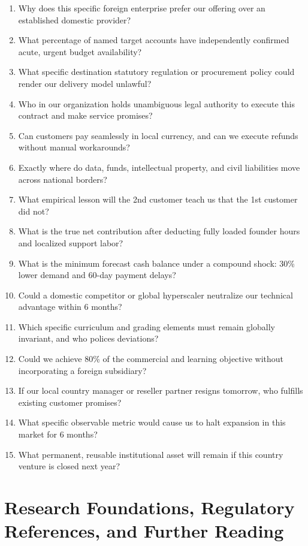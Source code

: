 \begin{enumerate}
    \item Why does this specific foreign enterprise prefer our offering over an established domestic provider?
    \item What percentage of named target accounts have independently confirmed acute, urgent budget availability?
    \item What specific destination statutory regulation or procurement policy could render our delivery model unlawful?
    \item Who in our organization holds unambiguous legal authority to execute this contract and make service promises?
    \item Can customers pay seamlessly in local currency, and can we execute refunds without manual workarounds?
    \item Exactly where do data, funds, intellectual property, and civil liabilities move across national borders?
    \item What empirical lesson will the 2nd customer teach us that the 1st customer did not?
    \item What is the true net contribution after deducting fully loaded founder hours and localized support labor?
    \item What is the minimum forecast cash balance under a compound shock: 30\% lower demand and 60-day payment delays?
    \item Could a domestic competitor or global hyperscaler neutralize our technical advantage within 6 months?
    \item Which specific curriculum and grading elements must remain globally invariant, and who polices deviations?
    \item Could we achieve 80\% of the commercial and learning objective without incorporating a foreign subsidiary?
    \item If our local country manager or reseller partner resigns tomorrow, who fulfills existing customer promises?
    \item What specific observable metric would cause us to halt expansion in this market for 6 months?
    \item What permanent, reusable institutional asset will remain if this country venture is closed next year?
\end{enumerate}

\section{Research Foundations, Regulatory References, and Further Reading}

